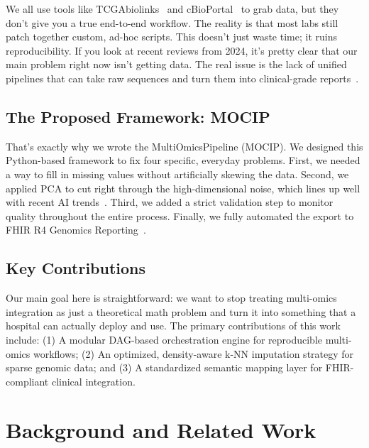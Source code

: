 \documentclass[conference,flushend]{iaria} %
\begin{document}
We all use tools like TCGAbiolinks~\cite{colaprico2016} and cBioPortal~\cite{cerami2012} to grab data, but they don't give you a true end-to-end workflow. The reality is that most labs still patch together custom, ad-hoc scripts. This doesn't just waste time; it ruins reproducibility. If you look at recent reviews from 2024, it's pretty clear that our main problem right now isn't getting data. The real issue is the lack of unified pipelines that can take raw sequences and turn them into clinical-grade reports~\cite{abdelaziz2024multi,hernandez2024methods}.

\subsection{The Proposed Framework: MOCIP}
That's exactly why we wrote the MultiOmicsPipeline (MOCIP). We designed this Python-based framework to fix four specific, everyday problems. First, we needed a way to fill in missing values without artificially skewing the data. Second, we applied PCA to cut right through the high-dimensional noise, which lines up well with recent AI trends~\cite{nam2024harnessing}. Third, we added a strict validation step to monitor quality throughout the entire process. Finally, we fully automated the export to FHIR R4 Genomics Reporting~\cite{mandel2016}. 

\subsection{Key Contributions}
Our main goal here is straightforward: we want to stop treating multi-omics integration as just a theoretical math problem and turn it into something that a hospital can actually deploy and use. The primary contributions of this work include: (1) A modular DAG-based orchestration engine for reproducible multi-omics workflows; (2) An optimized, density-aware k-NN imputation strategy for sparse genomic data; and (3) A standardized semantic mapping layer for FHIR-compliant clinical integration.

\section{Background and Related Work}
\end{document}
